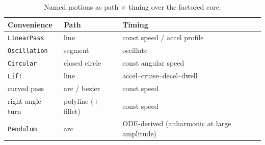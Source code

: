 \documentclass[11pt,a4paper]{article}
\theoremstyle{reqstyle}
\begin{document}
\begin{table}[h]
\centering
\caption{Named motions as path $\times$ timing over the factored core.}
\label{tab:motions}
\small
\begin{tabular}{@{}lll@{}}
\toprule
Convenience & Path & Timing \\
\midrule
\texttt{LinearPass}  & line              & const speed / accel profile \\
\texttt{Oscillation} & segment           & oscillate \\
\texttt{Circular}    & closed circle     & const angular speed \\
\texttt{Lift}        & line              & accel--cruise--decel--dwell \\
curved pass          & arc / bezier      & const speed \\
right-angle turn     & polyline ($+$ fillet) & const speed \\
\texttt{Pendulum}    & arc               & ODE-derived (anharmonic at large amplitude) \\
\bottomrule
\end{tabular}
\end{table}
\end{document}
